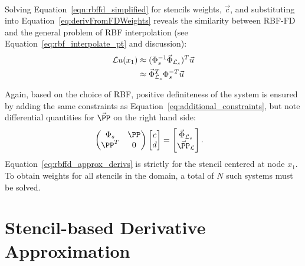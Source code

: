 \documentclass{report}
\begin{document}
{\begin{align}
                         \label{eqn:rbffd_simplified}
        \end{align} 
Solving Equation~\ref{eqn:rbffd_simplified} for stencils weights, $\vec{c}$, and substituting into Equation~\ref{eq:derivFromFDWeights} reveals the similarity between RBF-FD and the general problem of RBF interpolation (see Equation~\ref{eq:rbf_interpolate_pt} and discussion): 
        \begin{align*} 
        \mathcal{L}u(x_1) &\approx (\Phi^{-1}_s \vec{\Phi}_{\mathcal{L}_s})^T \vec{u} \\
        &\approx \vec{\Phi}_{\mathcal{L}_s}^T \Phi^{-T}_s \vec{u}
        \label{eq:rbffd_approx_derivs}
        \end{align*}
        
	
Again, based on the choice of RBF, positive definiteness of the system is ensured by adding the same constraints as Equation~\ref{eq:additional_constraints}, but note differential quantities for $\vec{\PP}$ on the right hand side: 
	\begin{align}
		\begin{pmatrix}
		\Phi_s & \PP \\
		\PP^T & 0
		\end{pmatrix} \begin{bmatrix}
							c \\ 
							d
							\end{bmatrix}
				 &= \begin{bmatrix}
							\vec{\Phi}_{\diffop{}_s} \\
							\vec{\PP}_{\diffop{}}
							 \end{bmatrix}.
	\end{align}
Equation~\ref{eq:rbffd_approx_derivs} is strictly for the stencil centered at node $x_1$. To obtain weights for all stencils in the domain, a total of $N$ such systems must be solved. %





\section{Stencil-based Derivative Approximation}

}
\end{document}
